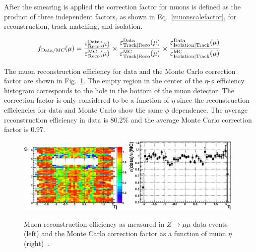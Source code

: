 After the smearing is applied the correction factor for muons is defined as the product of three independent factors, as shown in Eq.~\ref{muonscalefactor}, for reconstruction, track matching, and isolation.

\begin{equation}
\label{muonscalefactor}
f_{\rm{Data/MC}}(\mu) = \frac{\varepsilon^{\rm{Data}}_{\rm{Reco}}(\mu)}{\varepsilon^{\rm{MC}}_{\rm{Reco}}(\mu)} \times 
\frac{\varepsilon^{\rm{Data}}_{\rm{Track|Reco}}(\mu)}{\varepsilon^{\rm{MC}}_{\rm{Track|Reco}}(\mu)} \times \frac{\varepsilon^{\rm{Data}}_{\rm{Isolation|Track}}(\mu)}{\varepsilon^{\rm{MC}}_{\rm{Isolation|Track}}(\mu)}
\end{equation}

The muon reconstruction efficiency for data and the Monte Carlo correction factor are shown in Fig.~\ref{muonrecoeffscale}. The empty region in the center of the $\eta$-$\phi$ efficiency histogram corresponds to the hole in the bottom of the muon detector. The correction factor is only considered to be a function of $\eta$ since the reconstruction efficiencies for data and Monte Carlo show the same $\phi$ dependence. The average reconstruction efficiency in data is 80.2$\%$ and the average Monte Carlo correction factor is $0.97$.

\begin{figure}[!h!tbp]
\begin{center}
\includegraphics[width=0.49\textwidth]{eps/Reco/muonreco.eps}
\includegraphics[width=0.49\textwidth]{eps/Reco/muonrecoscale.eps}
\end{center}
\vspace{-0.1in}
\caption{Muon reconstruction efficiency as measured in $Z\rightarrow \mu\mu$ data events (left) and the Monte Carlo correction factor as a function of muon $\eta$ (right)~\cite{muon}.}
\label{muonrecoeffscale}
\end{figure}

